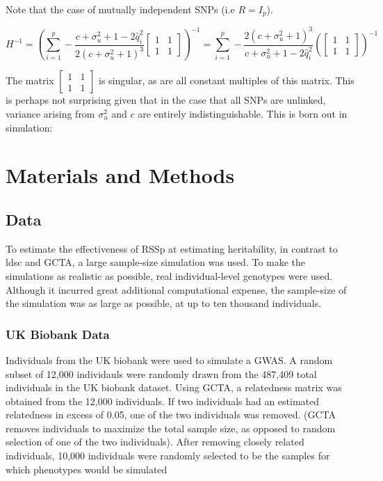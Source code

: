 Note that the case of mutually independent SNPs (i.e \(R=I_p\)). 

$$H^{-1}=\left(\sum_{i=1}^p - \frac{c +  \sigma_u^2 + 1 - 2 \hat{q}_i^2}{2 (c + \sigma_u^2 + 1)^3}   
\begin{bmatrix} 1 & 1\\ 1 & 1\end{bmatrix}\right)^{-1}=\sum_{i=1}^p - \frac{2 (c + \sigma_u^2 + 1)^3}{c +  \sigma_u^2 + 1 - 2 \hat{q}_i^2}
\left(\begin{bmatrix} 1 & 1\\ 1 & 1\end{bmatrix}\right)^{-1}$$

The matrix \(\begin{bmatrix} 1 & 1\\ 1 & 1\end{bmatrix}\) is singular, as are all constant multiples of this matrix.  This is perhaps not surprising given that in the case that all SNPs are unlinked, variance arising from \(\sigma_u^2\) and \(c\) are entirely indistinguishable.  This is born out in simulation:


\section{Materials and Methods}\label{sec:org762fc74}

\subsection{Data}\label{sec:org079c51d}




To estimate the effectiveness of RSSp at estimating heritability, in contrast to ldsc and GCTA, a large sample-size simulation was used.  To make the simulations as realistic as possible, real individual-level genotypes were used.  Although it incurred great additional
computational expense, the sample-size of the simulation was as large as possible, at up to ten thousand individuals.

\subsubsection{UK Biobank Data}\label{sec:org642e65e}

Individuals from the UK biobank were used to simulate a GWAS.  A random subset of 12,000 individauls were randomly drawn from the 487,409 total individuals in the UK biobank dataset.  Using GCTA, a relatedness matrix was obtained from the 12,000 individuals.
If two individuals had an estimated relatedness in excess of 0.05, one of the two individuals was removed.  (GCTA removes individuals to maximize the total sample size, as opposed to random selection of one of the two individuals).  After removing closely related 
individuals, 10,000 individuals were randomly selected to be the samples for which phenotypes would be simulated



